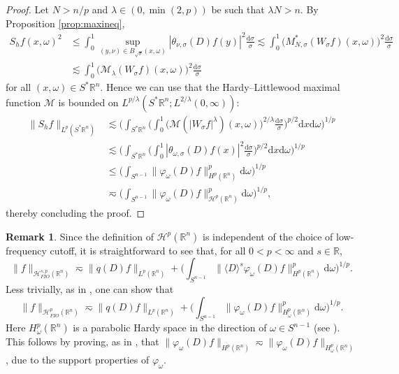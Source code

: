 \documentclass{amsart}
\newcommand {\ud}{\mathrm{d}}
\newcommand {\HT}{\mathcal{H}}
\newcommand {\Hp}{\mathcal{H}^{p}_{FIO}(\Rn)}
\newcommand {\Hps}{\mathcal{H}^{s,p}_{FIO}(\Rn)}
\newcommand {\la}{\lambda}
\newcommand {\rb}{\rangle}
\newcommand {\lb}{\langle}
\newcommand {\Ma}{\mathcal{M}}
\newcommand {\ph}{\varphi}
\newcommand {\R}{\mathbb R}
\newcommand {\Rn}{\mathbb{R}^{n}}
\newcommand {\Sp}{S^{*}\Rn}
\newcommand {\Sw}{\mathcal{S}}
\newcommand {\w}{\omega}
\theoremstyle{definition}
\newtheorem{remark}[theorem]{Remark}
\numberwithin{equation}{section}
\begin{document}
\begin{proof}
Let $N>n/p$ and $\la\in(0,\min(2,p))$ be such that $\lambda N>n$. By Proposition \ref{prop:maxineq},
\begin{align*}
S_{h}f(x,\omega)^{2}&\leq\int_{0}^{1}\sup_{(y,\nu)\in B_{\sqrt{\sigma}}(x,\omega)} |\theta_{\nu,{\sigma}}(D)f(y)|^{2}\frac{\ud\sigma}{\sigma}\lesssim \int_{0}^{1}\big(M_{N,\sigma}^{*}(W_{\sigma}f)(x,\omega)\big)^{2}\frac{\ud\sigma}{\sigma}\\
&\lesssim\int_{0}^{1}\big(\mathcal{M}_{\lambda}(W_{\sigma}f)(x,\omega)\big)^{2}\frac{\ud\sigma}{\sigma}
\end{align*}
for all $(x,\w)\in\Sp$. Hence we can use that the Hardy--Littlewood maximal function $\Ma$ is bounded on $L^{p/\la}(\Sp;L^{2/\la}(0,\infty))$:
\begin{align*}
\|S_{h}f\|_{L^{p}(\Sp)}&\lesssim\Big(\int_{\Sp}\Big(\int_{0}^{1}\big(\Ma(|W_{\sigma}f|^{\la})(x,\omega)\big)^{2/\la}\frac{\ud\sigma}{\sigma}\Big)^{p/2}\ud x\ud\w\Big)^{1/p}\\
&\lesssim \Big(\int_{\Sp}\Big(\int_{0}^{1}|\theta_{\w,\sigma}(D)f(x)|^{2}\frac{\ud\sigma}{\sigma}\Big)^{p/2}\ud x\ud\w\Big)^{1/p}\\
&\leq\Big(\int_{S^{n-1}}\|\ph_{\w}(D)f\|_{H^{p}(\Rn)}^{p}\ud\w\Big)^{1/p}\\
&\eqsim \Big(\int_{S^{n-1}}\|\ph_{\w}(D)f\|_{\HT^{p}(\Rn)}^{p}\ud\w\Big)^{1/p},
\end{align*}
thereby concluding the proof.
\end{proof}

\begin{remark}\label{rem:anisHardy}
Since the definition of $\HT^{p}(\Rn)$ is independent of the choice of low-frequency cutoff, it is straightforward to see that, for all $0<p<\infty$ and $s\in\R$, %
\[
\|f\|_{\Hps}\eqsim \|q(D)f\|_{L^{p}(\Rn)}+\Big(\int_{S^{n-1}}\|\lb D\rb^{s}\ph_{\w}(D)f\|_{H^{p}(\Rn)}^{p}\ud\w\Big)^{1/p}.
\]
Less trivially, as in \cite{HaPoRoYu23}, one can show that %
\[
\|f\|_{\Hp}\eqsim \|q(D)f\|_{L^{p}(\Rn)}+\Big(\int_{S^{n-1}}\|\ph_{\w}(D)f\|_{H^{p}_{\w}(\Rn)}^{p}\ud\w\Big)^{1/p}.
\]
Here $H^{p}_{\w}(\Rn)$ is a parabolic Hardy space in the direction of $\w\in S^{n-1}$ (see \cite{HaPoRoYu23,Calderon-Torchinsky75,Calderon-Torchinsky77}). This follows by proving, as in \cite{HaPoRoYu23}, that $\|\ph_{\w}(D)f\|_{H^{p}(\Rn)}\eqsim \|\ph_{\w}(D)f\|_{H^{p}_{\w}(\Rn)}$, due to the support properties of $\ph_{\w}$.
\end{remark}
\end{document}
